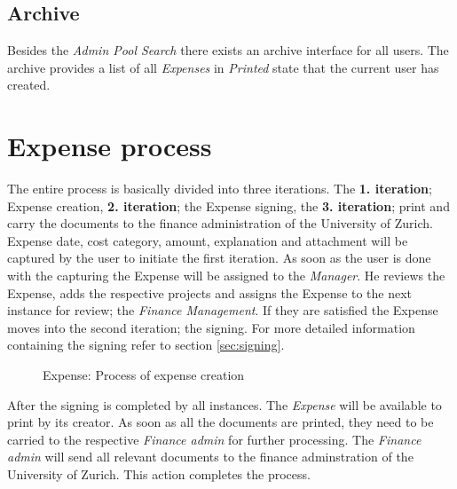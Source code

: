 \subsection{Archive}
Besides the \textit{Admin Pool Search} there exists an archive interface for all users. The archive provides a list of all \textit{Expenses} in \textit{Printed} state that the current user has created.\newpage  

\section{Expense process}
\label{sec:process}

The entire process is basically divided into three iterations. The \textbf{1. iteration}; Expense creation, \textbf{2. iteration}; the Expense signing, the \textbf{3. iteration}; print and carry the documents to the finance administration of the University of Zurich.\newline 
Expense date, cost category, amount, explanation and attachment will be captured by the user to initiate the first iteration. As soon as the user is done with the capturing the Expense will be assigned to the \textit{Manager}. He reviews the Expense, adds the respective projects and assigns the Expense to the next instance for review; the \textit{Finance Management}. If they are satisfied the Expense moves into the second iteration; the signing. For more detailed information containing the signing refer to section \ref{sec:signing}.\newline

\begin{figure}[H]
    \centering
    \caption{Expense: Process of expense creation}
    \label{fig:expense-process}
\end{figure}

After the signing is completed by all instances. The \textit{Expense} will be available to print by its creator. As soon as all the documents are printed, they need to be carried to the respective \textit{Finance admin} for further processing. The \textit{Finance admin} will send all relevant documents to the finance adminstration of the University of Zurich. This action completes the process.   

